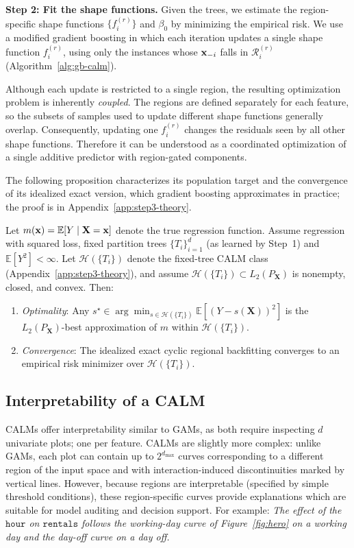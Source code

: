 \textbf{Step 2: Fit the shape functions.}
Given the trees, we estimate the region-specific shape functions $\{f_i^{(r)}\}$ and $\beta_0$ by minimizing the empirical risk.
We use a modified gradient boosting in which each iteration updates a single shape function $f_i^{(r)}$, using only the instances whose $\mathbf{x}_{-i}$ falls in $\mathcal{R}_i^{(r)}$ (Algorithm~\ref{alg:gb-calm}).

Although each update is restricted to a single region, the resulting optimization problem is inherently \emph{coupled}.
The regions are defined separately for each feature, so the subsets of samples used to update different shape functions generally overlap.
Consequently, updating one $f_i^{(r)}$ changes the residuals seen by all other shape functions.
Therefore it can be understood as a coordinated optimization of a single additive predictor with region-gated components.

The following proposition characterizes its population target and the convergence of its idealized exact version, which gradient boosting approximates in practice; the proof is in Appendix~\ref{app:step3-theory}.

\begin{proposition}
\label{prop:step3-main}
Let $m(\mathbf{x}) = \mathbb{E}[Y \mid \mathbf{X}=\mathbf{x}]$ denote the true regression function. Assume regression with squared loss, fixed partition trees $\{T_i\}_{i=1}^d$ (as learned by Step~1) and $\mathbb{E}[Y^2]<\infty$.
Let $\mathcal{H}(\{T_i\})$ denote the fixed-tree CALM class (Appendix~\ref{app:step3-theory}), and assume
$\mathcal{H}(\{T_i\})\subset L_2(P_{\mathbf{X}})$ is nonempty, closed, and convex.
Then:
\begin{enumerate}
    \item \emph{Optimality}: 
    Any 
    $s^\star \in \arg\min_{s\in\mathcal{H}(\{T_i\})} \mathbb{E}[(Y-s(\mathbf{X}))^2]$
    is the $L_2(P_{\mathbf{X}})$-best approximation of $m$ within $\mathcal{H}(\{T_i\})$.
    \item \emph{Convergence}: The idealized exact cyclic regional backfitting converges to an empirical risk minimizer over $\mathcal{H}(\{T_i\})$.
\end{enumerate}
\end{proposition}

\subsection{Interpretability of a CALM} \label{subsec:interpretability-properties}
CALMs offer interpretability similar to GAMs, as both require inspecting $d$ univariate plots; one per feature.
CALMs are slightly more complex: unlike GAMs, each plot can contain up to $2^{d_{\text{max}}}$ curves corresponding to a different region of the input space and with interaction-induced discontinuities marked by vertical lines.
However, because regions are interpretable (specified by simple threshold conditions), these region-specific curves provide explanations which are suitable for model auditing and decision support.
For example:
\textit{The effect of the $\mathtt{hour}$ on $\mathtt{rentals}$ follows the working-day curve of Figure~\ref{fig:hero} on a working day and the day-off curve on a day off.}


